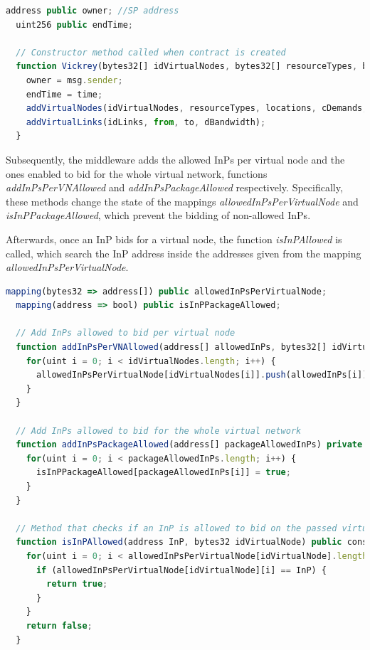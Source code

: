 \begin{lstlisting}[language=JavaScript,caption={Data structures and functions called when the Vickrey contract is created}, label={lst:Vickrey0}]
  address public owner; //SP address
  uint256 public endTime;
    
  // Constructor method called when contract is created
  function Vickrey(bytes32[] idVirtualNodes, bytes32[] resourceTypes, bytes32[] locations, uint8[] upperBoundCosts, uint8[] cDemands, bytes32[] idLinks, bytes32[] from, bytes32[] to, uint8[] dBandwidth, uint256 time) public {
    owner = msg.sender;
    endTime = time;
    addVirtualNodes(idVirtualNodes, resourceTypes, locations, cDemands, upperBoundCosts);
    addVirtualLinks(idLinks, from, to, dBandwidth);
  }
\end{lstlisting}

Subsequently, the middleware adds the allowed InPs per virtual node and the ones enabled to bid for the whole virtual network, functions \textit{addInPsPerVNAllowed} and \textit{addInPsPackageAllowed} respectively. Specifically, these methods change the state of the mappings \textit{allowedInPsPerVirtualNode} and \textit{isInPPackageAllowed}, which prevent the bidding of non-allowed InPs.

Afterwards, once an InP bids for a virtual node, the function \textit{isInPAllowed} is called, which search the InP address inside the addresses given from the mapping \textit{allowedInPsPerVirtualNode}.
\newline

\begin{lstlisting}[language=JavaScript,caption={Data structures and functions called to prevent the bidding of non-allowed InPs.}, label={lst:Vickrey1}]
  mapping(bytes32 => address[]) public allowedInPsPerVirtualNode;
  mapping(address => bool) public isInPPackageAllowed;
  
  // Add InPs allowed to bid per virtual node
  function addInPsPerVNAllowed(address[] allowedInPs, bytes32[] idVirtualNodes) private {
    for(uint i = 0; i < idVirtualNodes.length; i++) {
      allowedInPsPerVirtualNode[idVirtualNodes[i]].push(allowedInPs[i]);
    }
  }

  // Add InPs allowed to bid for the whole virtual network
  function addInPsPackageAllowed(address[] packageAllowedInPs) private {
    for(uint i = 0; i < packageAllowedInPs.length; i++) {
      isInPPackageAllowed[packageAllowedInPs[i]] = true;
    }
  }
  
  // Method that checks if an InP is allowed to bid on the passed virtual node.
  function isInPAllowed(address InP, bytes32 idVirtualNode) public constant returns (bool){
    for(uint i = 0; i < allowedInPsPerVirtualNode[idVirtualNode].length; i++) {
      if (allowedInPsPerVirtualNode[idVirtualNode][i] == InP) {
        return true;
      }
    }
    return false;
  }
\end{lstlisting}

